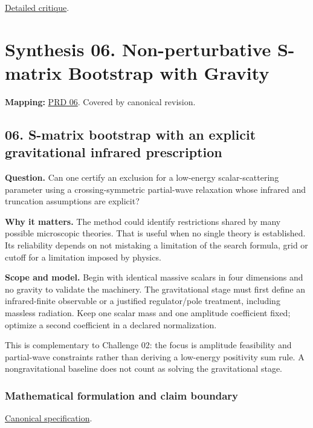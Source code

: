 \documentclass[
  11pt,
]{article}
\begin{document}
\href{https://github.com/rick-stevens-ai/Pure-Thought/blob/main/reviews/05-Positive-Geometry-Gravity.md}{Detailed
critique}.

\section{Synthesis 06. Non-perturbative S-matrix Bootstrap with Gravity}

\textbf{Mapping:}
\href{https://github.com/rick-stevens-ai/Pure-Thought/blob/main/PRDs/06-Nonperturbative-S-matrix-Bootstrap.md}{PRD
06}. Covered by canonical revision.

\subsection{06. S-matrix bootstrap with an explicit gravitational
infrared prescription}

\textbf{Question.} Can one certify an exclusion for a low-energy
scalar-scattering parameter using a crossing-symmetric partial-wave
relaxation whose infrared and truncation assumptions are explicit?

\textbf{Why it matters.} The method could identify restrictions shared
by many possible microscopic theories. That is useful when no single
theory is established. Its reliability depends on not mistaking a
limitation of the search formula, grid or cutoff for a limitation
imposed by physics.

\textbf{Scope and model.} Begin with identical massive scalars in four
dimensions and no gravity to validate the machinery. The gravitational
stage must first define an infrared-finite observable or a justified
regulator/pole treatment, including massless radiation. Keep one scalar
mass and one amplitude coefficient fixed; optimize a second coefficient
in a declared normalization.

This is complementary to Challenge 02: the focus is amplitude
feasibility and partial-wave constraints rather than deriving a
low-energy positivity sum rule. A nongravitational baseline does not
count as solving the gravitational stage.

\subsubsection{Mathematical formulation and claim boundary}

\href{https://github.com/rick-stevens-ai/Pure-Thought/blob/main/PRDs/06-Nonperturbative-S-matrix-Bootstrap.md}{Canonical
specification}.
\end{document}
